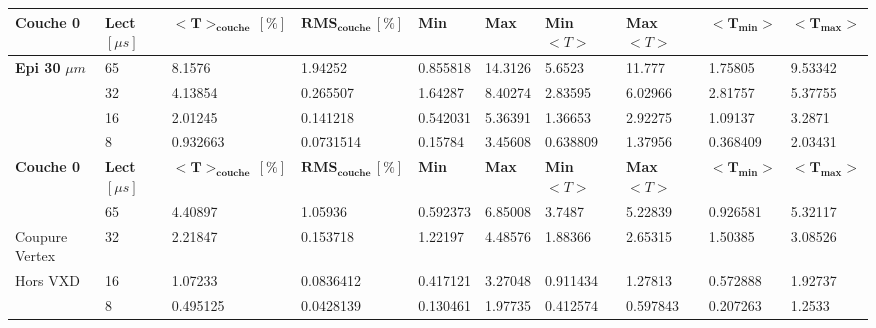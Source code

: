 \begin{table}
\begin{tabular}{|l|l|l|l|l|l|l|l|l|l|}
\textbf{Couche 0}             & \textbf{Lect} $[\mu s]$ & $\mathbf{<T>_{couche} \, [\%]}$ & $\mathbf{RMS_{couche} \, [\%]}$ & \textbf{Min} & \textbf{Max} & \textbf{Min} $<T>$ & \textbf{Max} $<T>$ & $\mathbf{<T_{min}>}$ & $\mathbf{<T_{max}>}$ \\ \hline
    \textbf{Epi 30} $\mu m$    & 65            & 8.1576                   & 1.94252                 & 0.855818  & 14.3126   & 5.6523        & 11.777        & 1.75805         & 9.53342         \\ \hline
                              & 32            & 4.13854                  & 0.265507                & 1.64287   & 8.40274   & 2.83595       & 6.02966       & 2.81757         & 5.37755         \\ \hline
                              & 16            & 2.01245                  & 0.141218                & 0.542031  & 5.36391   & 1.36653       & 2.92275       & 1.09137         & 3.2871          \\ \hline
                              & 8             & 0.932663                 & 0.0731514               & 0.15784   & 3.45608   & 0.638809      & 1.37956       & 0.368409        & 2.03431         \\ \hline
\textbf{Couche 0}             & \textbf{Lect} $[\mu s]$ & $\mathbf{<T>_{couche} \, [\%]}$ & $\mathbf{RMS_{couche} \, [\%]}$ & \textbf{Min} & \textbf{Max} & \textbf{Min} $<T>$ & \textbf{Max} $<T>$ & $\mathbf{<T_{min}>}$ & $\mathbf{<T_{max}>}$ \\ \hline
                              & 65            & 4.40897                  & 1.05936                 & 0.592373  & 6.85008   & 3.7487        & 5.22839       & 0.926581        & 5.32117         \\ \hline
Coupure Vertex                & 32            & 2.21847                  & 0.153718                & 1.22197   & 4.48576   & 1.88366       & 2.65315       & 1.50385         & 3.08526         \\ \hline
Hors VXD                      & 16            & 1.07233                  & 0.0836412               & 0.417121  & 3.27048   & 0.911434      & 1.27813       & 0.572888        & 1.92737         \\ \hline
                              & 8             & 0.495125                 & 0.0428139               & 0.130461  & 1.97735   & 0.412574      & 0.597843      & 0.207263        & 1.2533          \\ \hline
\end{tabular}

\end{table}

